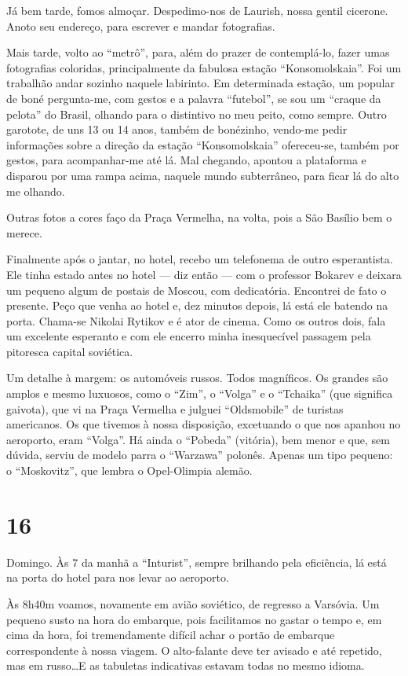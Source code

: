 Já bem tarde, fomos almoçar. Despedimo-nos de Laurish, nossa gentil cicerone. Anoto seu endereço, para escrever e mandar fotografias.

Mais tarde, volto ao ``metrô'', para, além do prazer de contemplá-lo, fazer umas fotografias coloridas, principalmente da fabulosa estação ``Konsomolskaia''. Foi um trabalhão andar sozinho naquele labirinto. Em determinada estação, um popular de boné pergunta-me, com gestos e a palavra ``futebol'', se sou um ``craque da pelota'' do Brasil, olhando para o distintivo no meu peito, como sempre. Outro garotote, de uns 13 ou 14 anos, também de bonézinho, vendo-me pedir informações sobre a direção da estação ``Konsomolskaia'' ofereceu-se, também por gestos, para acompanhar-me até lá. Mal chegando, apontou a plataforma e disparou por uma rampa acima, naquele mundo subterrâneo, para ficar lá do alto me olhando.

Outras fotos a cores faço da Praça Vermelha, na volta, pois a São Basílio bem o merece.

Finalmente após o jantar, no hotel, recebo um telefonema de outro esperantista. Ele tinha estado antes no hotel --- diz então --- com o professor Bokarev e deixara um pequeno algum de postais de Moscou, com dedicatória. Encontrei de fato o presente. Peço que venha ao hotel e, dez minutos depois, lá está ele batendo na porta. Chama-se Nikolai Rytikov e é ator de cinema. Como os outros dois, fala um excelente esperanto e com ele encerro minha inesquecível passagem pela pitoresca capital soviética.

Um detalhe à margem: os automóveis russos. Todos magníficos. Os grandes são amplos e mesmo luxuosos, como o ``Zim'', o ``Volga'' e o ``Tchaika'' (que significa gaivota), que vi na Praça Vermelha e julguei ``Oldsmobile'' de turistas americanos. Os que tivemos à nossa disposição, excetuando o que nos apanhou no aeroporto, eram ``Volga''. Há ainda o ``Pobeda'' (vitória), bem menor e que, sem dúvida, serviu de modelo parra o ``Warzawa'' polonês. Apenas um tipo pequeno: o ``Moskovitz'', que lembra o Opel-Olimpia alemão.

\section*{16 \adfflatleafright {}}
Domingo. Às 7 da manhã a ``Inturist'', sempre brilhando pela eficiência, lá está na porta do hotel para nos levar ao aeroporto.

Às 8h40m voamos, novamente em avião soviético, de regresso a Varsóvia. Um pequeno susto na hora do embarque, pois facilitamos no gastar o tempo e, em cima da hora, foi tremendamente difícil achar o portão de embarque correspondente à nossa viagem. O alto-falante deve ter avisado e até repetido, mas em russo\ldots E as tabuletas indicativas estavam todas no mesmo idioma.

